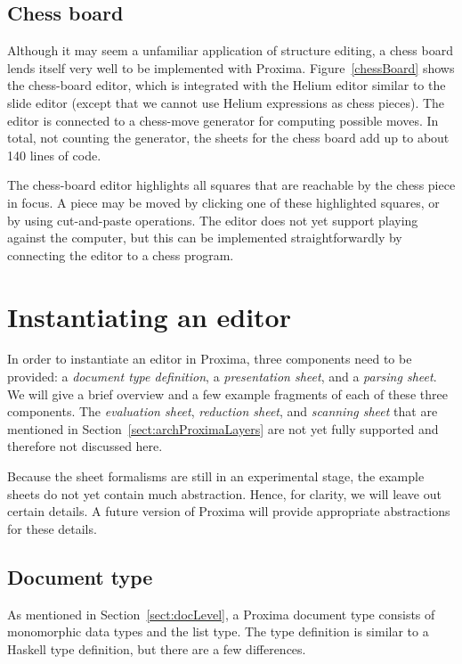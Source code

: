 \subsection{Chess board}

Although it may seem a unfamiliar application of structure editing, a chess board lends itself very well to be implemented with Proxima.  Figure~\ref{chessBoard} shows the chess-board editor, which is integrated with the Helium editor similar to the slide editor (except that we cannot use Helium expressions as chess pieces). The editor is connected to a chess-move generator for computing possible moves. In total, not counting the generator, the sheets for the chess board add up to about 140 lines of code.
\finalshortpage

The chess-board editor highlights all squares that are reachable by the chess piece in focus. A piece may be moved by clicking one of these highlighted squares, or by using cut-and-paste operations. The editor does not yet support playing against the computer, but this can be implemented straightforwardly by connecting the editor to a chess program. 


%																
%																
%																
\section{Instantiating an editor} \label{sect:instantiating}

In order to instantiate an editor in Proxima, three components need to be provided: a {\em document type definition}, a {\em presentation sheet}, and a {\em parsing sheet}. We will give a brief overview and a few example fragments of each of these three components. The {\em evaluation sheet}, {\em reduction sheet}, and {\em scanning sheet} that are mentioned in Section~\ref{sect:archProximaLayers} are not yet fully supported and therefore not discussed here.

Because the sheet formalisms are still in an experimental stage, the example sheets do not yet contain much abstraction. Hence, for clarity, we will leave out certain details. A future version of Proxima will provide appropriate abstractions for these details. 

\subsection{Document type}

As mentioned in Section~\ref{sect:docLevel}, a Proxima document type consists of monomorphic data types and the list type. The type definition is similar to a Haskell type definition, but there are a few differences. 

